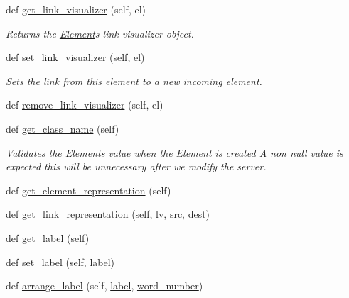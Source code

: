 \begin{DoxyCompactItemize}
def \mbox{\hyperlink{class_bridges_1_1_element_1_1_element_ac1627e47169e665776a0df1a886432f8}{get\+\_\+link\+\_\+visualizer}} (self, el)
\begin{DoxyCompactList}\small\item\em Returns the \mbox{\hyperlink{class_bridges_1_1_element_1_1_element}{Element}}\textquotesingle{}s link visualizer object. \end{DoxyCompactList}\item 
def \mbox{\hyperlink{class_bridges_1_1_element_1_1_element_a3dff4354421ee704ee7fbfd6fef37207}{set\+\_\+link\+\_\+visualizer}} (self, el)
\begin{DoxyCompactList}\small\item\em Sets the link from this element to a new incoming element. \end{DoxyCompactList}\item 
def \mbox{\hyperlink{class_bridges_1_1_element_1_1_element_ae617a08f086c0b9b62a82b84751c9d1e}{remove\+\_\+link\+\_\+visualizer}} (self, el)
\item 
def \mbox{\hyperlink{class_bridges_1_1_element_1_1_element_a8ac6ce7fef24e2f2dae3b7f56f079e4e}{get\+\_\+class\+\_\+name}} (self)
\begin{DoxyCompactList}\small\item\em Validates the \mbox{\hyperlink{class_bridges_1_1_element_1_1_element}{Element}}\textquotesingle{}s value when the \mbox{\hyperlink{class_bridges_1_1_element_1_1_element}{Element}} is created A non null value is expected this will be unnecessary after we modify the server. \end{DoxyCompactList}\item 
def \mbox{\hyperlink{class_bridges_1_1_element_1_1_element_ad636092154a89fab2488e9e4dcb139fd}{get\+\_\+element\+\_\+representation}} (self)
\item 
def \mbox{\hyperlink{class_bridges_1_1_element_1_1_element_af5801bce7a6a85723b96a64ea2502c3b}{get\+\_\+link\+\_\+representation}} (self, lv, src, dest)
\item 
def \mbox{\hyperlink{class_bridges_1_1_element_1_1_element_ae3daee3d51daa454b15d83d57d1c3b5c}{get\+\_\+label}} (self)
\item 
def \mbox{\hyperlink{class_bridges_1_1_element_1_1_element_a868e30c0f0fcfec4111d8a22e1e946e9}{set\+\_\+label}} (self, \mbox{\hyperlink{class_bridges_1_1_element_1_1_element_a301fe5be8cf72b2c62f6a218feeb9166}{label}})
\item 
def \mbox{\hyperlink{class_bridges_1_1_element_1_1_element_a081734e11984d316f229254557a6795e}{arrange\+\_\+label}} (self, \mbox{\hyperlink{class_bridges_1_1_element_1_1_element_a301fe5be8cf72b2c62f6a218feeb9166}{label}}, \mbox{\hyperlink{class_bridges_1_1_element_1_1_element_a857960f476b18de30baa18ae54877672}{word\+\_\+number}})

\end{DoxyCompactItemize}
